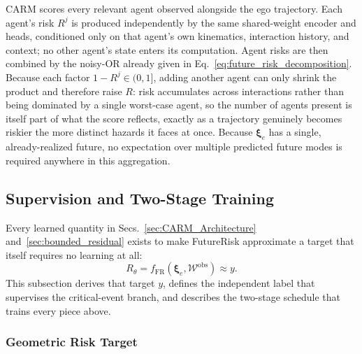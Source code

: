 \documentclass[letterpaper, 10 pt, conference]{ieeeconf}  %
\begin{document}
CARM scores every relevant agent observed alongside the ego trajectory.
Each agent's risk $R^j$ is produced independently by the same
shared-weight encoder and heads, conditioned only on that agent's own
kinematics, interaction history, and context; no other agent's state
enters its computation. Agent risks are then combined by the noisy-OR
already given in Eq.~\eqref{eq:future_risk_decomposition}. Because each
factor $1-R^j\in(0,1]$, adding another agent can only shrink
the product and therefore raise $R$: risk accumulates across interactions
rather than being dominated by a single worst-case agent, so the number
of agents present is itself part of what the score reflects, exactly as a
trajectory genuinely becomes riskier the more distinct hazards it faces
at once. Because $\bm{\xi}_e$ has a single, already-realized future, no
expectation over multiple predicted future modes is required anywhere in
this aggregation.


\subsection{Supervision and Two-Stage Training}
\label{sec:carm_training}

Every learned quantity in Secs.~\ref{sec:CARM_Architecture}
and~\ref{sec:bounded_residual} exists to make FutureRisk approximate a target
that itself requires no learning at all:
\begin{equation}
R_{\theta}
=f_{\mathrm{FR}}(\bm\xi_e,\mathcal W^{\mathrm{obs}})
\approx y.
\label{eq:carm_estimator}
\end{equation}
This subsection derives that target $y$, defines the independent label
that supervises the critical-event branch, and describes the two-stage
schedule that trains every piece above.

\subsubsection{Geometric Risk Target}
\end{document}
